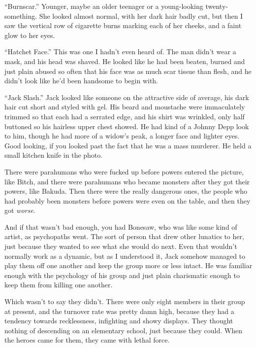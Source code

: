 ``Burnscar.'' Younger, maybe an older teenager or a young-looking twenty-something.  She looked almost normal, with her dark hair badly cut, but then I saw the vertical row of cigarette burns marking each of her cheeks, and a faint glow to her eyes.



``Hatchet Face.''  This was one I hadn't even heard of.  The man didn't wear a mask, and his head was shaved.  He looked like he had been beaten, burned and just plain abused so often that his face was as much scar tissue than flesh, and he didn't look like he'd been handsome to begin with.



``Jack Slash.''  Jack looked like someone on the attractive side of average, his dark hair cut short and styled with gel.  His beard and moustache were immaculately trimmed so that each had a serrated edge, and his shirt was wrinkled, only half buttoned so his hairless upper chest showed.  He had kind of a Johnny Depp look to him, though he had more of a widow's peak, a longer face and lighter eyes.  Good looking, if you looked past the fact that he was a mass murderer.  He held a small kitchen knife in the photo.



There were parahumans who were fucked up before powers entered the picture, like Bitch, and there were parahumans who became monsters after they got their powers, like Bakuda.  Then there were the really dangerous ones, the people who had probably been monsters before powers were even on the table, and then they got \emph{worse}.



And if that wasn't bad enough, you had Bonesaw, who was like some kind of artist, as psychopaths went.  The sort of person that drew other lunatics to her, just because they wanted to see what she would do next.  Even that wouldn't normally work as a dynamic, but as I understood it, Jack somehow managed to play them off one another and keep the group more or less intact.  He was familiar enough with the psychology of his group and just plain charismatic enough to keep them from killing one another.



Which wasn't to say they didn't.  There were only eight members in their group at present, and the turnover rate was pretty damn high, because they had a tendency towards recklessness, infighting and showy displays.  They thought nothing of descending on an elementary school, just because they could.  When the heroes came for them, they came with lethal force.



